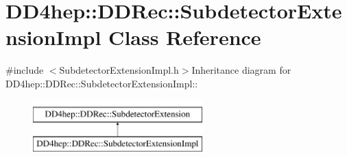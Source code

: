 \hypertarget{class_d_d4hep_1_1_d_d_rec_1_1_subdetector_extension_impl}{
\section{DD4hep::DDRec::SubdetectorExtensionImpl Class Reference}
\label{class_d_d4hep_1_1_d_d_rec_1_1_subdetector_extension_impl}
}


{\ttfamily \#include $<$SubdetectorExtensionImpl.h$>$}Inheritance diagram for DD4hep::DDRec::SubdetectorExtensionImpl::\begin{figure}[H]
\begin{center}
\leavevmode
\includegraphics[height=2cm]{class_d_d4hep_1_1_d_d_rec_1_1_subdetector_extension_impl}
\end{center}
\end{figure}
